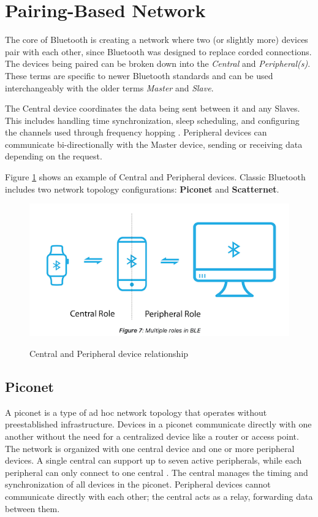 \section{Pairing-Based Network}

The core of Bluetooth is creating a network where two (or slightly more) devices pair with each other, since Bluetooth was designed to replace corded connections. The devices being paired can be broken down into the \textit{Central} and \textit{Peripheral(s)}. These terms are specific to newer Bluetooth standards and can be used interchangeably with the older terms \textit{Master} and \textit{Slave}.

The Central device coordinates the data being sent between it and any Slaves. This includes handling time synchronization, sleep scheduling, and configuring the channels used through frequency hopping \cite{nextgenBLE}. Peripheral devices can communicate bi-directionally with the Master device, sending or receiving data depending on the request.

Figure \ref{fig:centralperipheral} shows an example of Central and Peripheral devices. Classic Bluetooth includes two network topology configurations: \textbf{Piconet} and \textbf{Scatternet}.

\begin{figure}[h]
    \caption{Central and Peripheral device relationship}
    \includegraphics[scale=.7]{centralperipheral.png}
    \label{fig:centralperipheral}
    \end{figure}

\subsection{Piconet}

A piconet is a type of ad hoc network topology that operates without preestablished infrastructure. Devices in a piconet communicate directly with one another without the need for a centralized device like a router or access point. The network is organized with one central device and one or more peripheral devices. A single central can support up to seven active peripherals, while each peripheral can only connect to one central \cite{nextgenBLE}. The central manages the timing and synchronization of all devices in the piconet. Peripheral devices cannot communicate directly with each other; the central acts as a relay, forwarding data between them.

